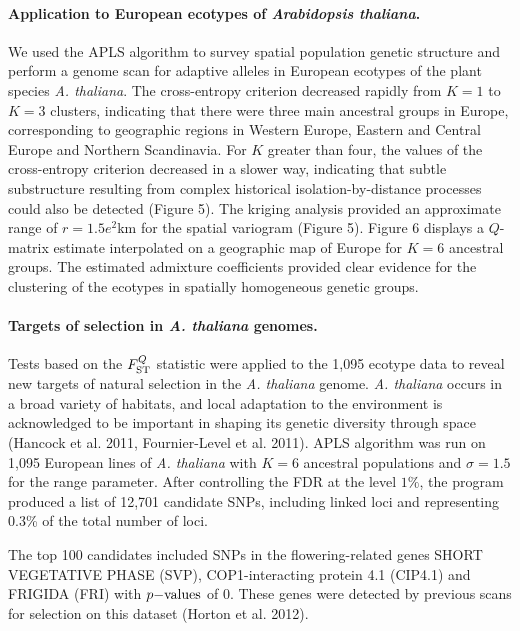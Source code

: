  
\paragraph{Application to European ecotypes of {\it Arabidopsis  thaliana}.} We used  the APLS algorithm to survey spatial population genetic structure and perform a genome scan for adaptive alleles in European ecotypes of the plant species {\it A.  thaliana}. The cross-entropy criterion decreased rapidly from $K=1$ to $K=3$ clusters,  indicating  that  there were three 
main ancestral groups in Europe, corresponding to geographic regions in Western Europe, Eastern and Central Europe and Northern Scandinavia. For $K$ greater than four, the values of the cross-entropy criterion decreased in a slower way, indicating that subtle substructure resulting from complex historical isolation-by-distance  processes could also be detected (Figure 5). 
The kriging analysis provided an approximate range of  $r = 1.5e^2$km for the spatial variogram (Figure 5).
Figure 6 displays a $Q$-matrix estimate  interpolated on a geographic map of Europe for $K = 6$ ancestral groups. The estimated admixture coefficients provided clear evidence for the clustering of the ecotypes in spatially homogeneous genetic groups. 

\paragraph{Targets of selection in {\it A.  thaliana} genomes.}  Tests based on the $F^Q_{\rm ST}$  statistic were applied to the 1,095 ecotype data to reveal new targets of natural selection in the {\it A. thaliana} genome. {\it A. thaliana} occurs in a broad variety of habitats, and local adaptation to the environment is acknowledged to be important in shaping its genetic diversity through space (Hancock et al. 2011, Fournier-Level et al. 2011). 
APLS algorithm was run on 1,095 European lines of {\it A. thaliana} with $K=6$ ancestral populations and $\sigma = 1.5$ for the range parameter. After controlling the FDR at the level $1\%$, the program produced a list of 12,701 candidate SNPs, including linked loci and representing 0.3\% of the total number of loci. 
 
 The top 100 candidates included SNPs in the flowering-related genes SHORT VEGETATIVE PHASE (SVP), COP1-interacting protein 4.1 (CIP4.1) and FRIGIDA (FRI) with $p{\rm -values}$ of 0. 
 These genes were detected by previous scans for selection on this dataset (Horton et al. 2012).
 
